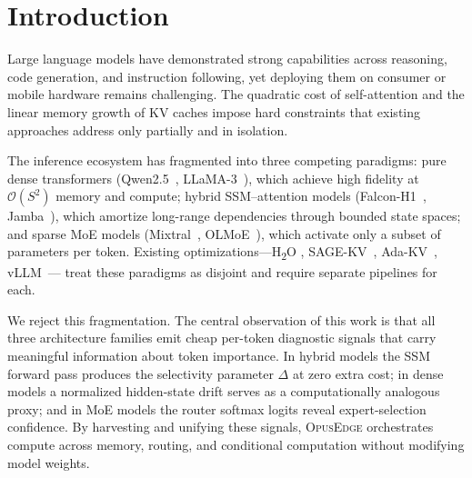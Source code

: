 \documentclass[11pt]{article}
\newcommand{\dsig}{\Delta}
\newcommand{\opusedge}{\textsc{OpusEdge}}
\newcommand{\Order}{\mathcal{O}}
\begin{document}
\section{Introduction}
Large language models have demonstrated strong capabilities across reasoning,
code generation, and instruction following, yet deploying them on consumer or
mobile hardware remains challenging. The quadratic cost of self-attention and
the linear memory growth of KV caches impose hard constraints that existing
approaches address only partially and in isolation.

The inference ecosystem has fragmented into three competing paradigms: pure
dense transformers (Qwen2.5~\cite{qwen25}, LLaMA-3~\cite{llama3}), which
achieve high fidelity at $\Order(S^2)$ memory and compute; hybrid
SSM--attention models (Falcon-H1~\cite{falconh1}, Jamba~\cite{jamba}), which
amortize long-range dependencies through bounded state spaces; and sparse
MoE models (Mixtral~\cite{mixtral}, OLMoE~\cite{olmoe}), which activate only
a subset of parameters per token. Existing optimizations---H\textsubscript{2}O
\cite{h2o}, SAGE-KV~\cite{sagekv}, Ada-KV~\cite{adakv}, vLLM~\cite{vllm}---
treat these paradigms as disjoint and require separate pipelines for each.

We reject this fragmentation. The central observation of this work is that
all three architecture families emit cheap per-token diagnostic signals that
carry meaningful information about token importance. In hybrid models the
SSM forward pass produces the selectivity parameter $\dsig$ at zero extra
cost; in dense models a normalized hidden-state drift serves as a
computationally analogous proxy; and in MoE models the router softmax logits
reveal expert-selection confidence. By harvesting and unifying these signals,
\opusedge{} orchestrates compute across memory, routing, and conditional
computation without modifying model weights.
\end{document}
